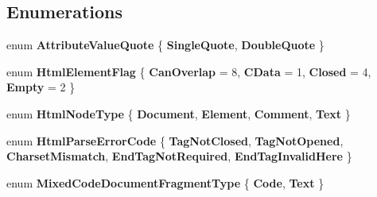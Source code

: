 \subsection*{Enumerations}
\begin{DoxyCompactItemize}
\item 
\mbox{\label{namespace_html_agility_pack_a64d9f2b9c91f0f73e761936646ebcc57}} 
enum {\bfseries Attribute\+Value\+Quote} \{ {\bfseries Single\+Quote}, 
{\bfseries Double\+Quote}
 \}
\item 
\mbox{\label{namespace_html_agility_pack_a4db40c4f5c900094c5a7fba47320a34a}} 
enum {\bfseries Html\+Element\+Flag} \{ {\bfseries Can\+Overlap} = 8, 
{\bfseries C\+Data} = 1, 
{\bfseries Closed} = 4, 
{\bfseries Empty} = 2
 \}
\item 
\mbox{\label{namespace_html_agility_pack_a0f81457339b5330e8cf9abe5a6123171}} 
enum {\bfseries Html\+Node\+Type} \{ {\bfseries Document}, 
{\bfseries Element}, 
{\bfseries Comment}, 
{\bfseries Text}
 \}
\item 
\mbox{\label{namespace_html_agility_pack_a73f43e39297685e4ddb8101f07585e45}} 
enum {\bfseries Html\+Parse\+Error\+Code} \{ \newline
{\bfseries Tag\+Not\+Closed}, 
{\bfseries Tag\+Not\+Opened}, 
{\bfseries Charset\+Mismatch}, 
{\bfseries End\+Tag\+Not\+Required}, 
\newline
{\bfseries End\+Tag\+Invalid\+Here}
 \}
\item 
\mbox{\label{namespace_html_agility_pack_a98759dfaafbba2b5cc44e142b78624fd}} 
enum {\bfseries Mixed\+Code\+Document\+Fragment\+Type} \{ {\bfseries Code}, 
{\bfseries Text}
 \}
\end{DoxyCompactItemize}
